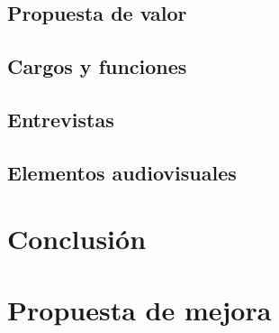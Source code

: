 \documentclass[10pt]{article}
\begin{document}
\subsection{Propuesta de valor}

\subsection{Cargos y funciones}

\subsection{Entrevistas}

\subsection{Elementos audiovisuales}

\section{Conclusión}

\section{Propuesta de mejora}
\end{document}
